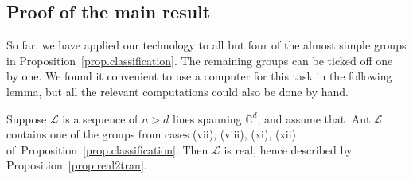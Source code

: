 \subsection{Proof of the main result}

So far, we have applied our technology to all but four of the almost simple groups in Proposition~\ref{prop.classification}.
The remaining groups can be ticked off one by one.
We found it convenient to use a computer for this task in the following lemma, but all the relevant computations could also be done by hand.


\begin{lemma}
\label{lem: misc cases}
Suppose $\mathscr{L}$ is a sequence of $n > d$ lines spanning $\mathbb{C}^d$, and assume that $\operatorname{Aut} \mathscr{L}$ contains one of the groups from cases (vii), (viii), (xi), (xii) of~Proposition~\ref{prop.classification}.
Then $\mathscr{L}$ is real, hence described by Proposition~\ref{prop:real2tran}.
\end{lemma}

